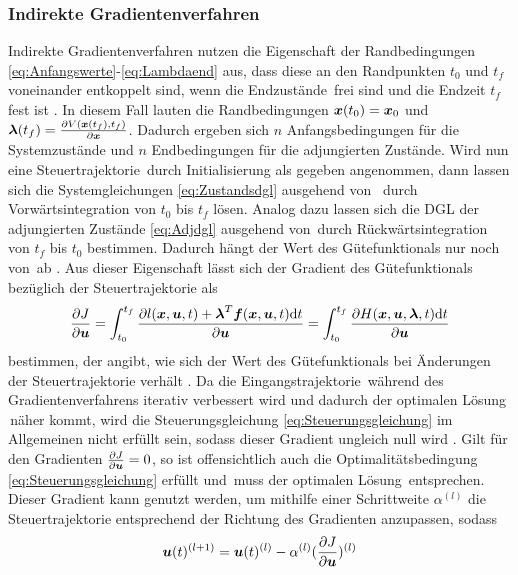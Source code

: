 \subsubsection{Indirekte Gradientenverfahren}\label{subsubsec:Gradientenverfahren_indirekt}
Indirekte Gradientenverfahren nutzen die Eigenschaft der Randbedingungen \eqref{eq:Anfangswerte}-\eqref{eq:Lambdaend} aus, dass diese an den Randpunkten $t_0$ und $t_f$ voneinander entkoppelt sind, wenn die Endzustände \xoftf\,frei sind und die Endzeit $t_f$ fest ist \cite{KnutGraichen.2012}. In diesem Fall lauten die Randbedingungen $\boldsymbol{x}(t_0) = \boldsymbol{x}_0$ und $\boldsymbol{\lambda}(t_f) = \frac{\partial V(\boldsymbol{x}(t_f),t_f)}{\partial \boldsymbol{x}}$. Dadurch ergeben sich $n$ Anfangsbedingungen für die Systemzustände und $n$ Endbedingungen für die adjungierten Zustände. Wird nun eine Steuertrajektorie \uoft\,durch Initialisierung als gegeben angenommen, dann lassen sich die Systemgleichungen \eqref{eq:Zustandsdgl} ausgehend von \xzero\, durch Vorwärtsintegration von $t_0$ bis $t_f$ lösen. Analog dazu lassen sich die \gls{DGL} der adjungierten Zustände \eqref{eq:Adjdgl} ausgehend von \lambdaoftf\,durch Rückwärtsintegration von $t_f$ bis $t_0$ bestimmen. Dadurch hängt der Wert des Gütefunktionals nur noch von \uoft\,ab \cite{Papageorgiou.2012}. Aus dieser Eigenschaft lässt sich der Gradient des Gütefunktionals bezüglich der Steuertrajektorie als
\begin{equation}
	\frac{\partial J}{\partial \boldsymbol{u}} = \int_{t_0}^{t_f}\frac{\partial l(\boldsymbol{x},\boldsymbol{u},t) + \boldsymbol{\lambda}^T\boldsymbol{f}(\boldsymbol{x},\boldsymbol{u},t)\textrm{d}{t}}{\partial \boldsymbol{u}} = \int_{t_0}^{t_f}\frac{\partial H(\boldsymbol{x},\boldsymbol{u},\boldsymbol{\lambda},t)\textrm{d}{t}}{\partial \boldsymbol{u}}
\end{equation}
bestimmen, der angibt, wie sich der Wert des Gütefunktionals bei Änderungen der Steuertrajektorie verhält \cite{Papageorgiou.2012}. Da die Eingangstrajektorie \uoft\,während des Gradientenverfahrens iterativ verbessert wird und dadurch der optimalen Lösung \uoptoft\,näher kommt, wird die Steuerungsgleichung \eqref{eq:Steuerungsgleichung} im Allgemeinen nicht erfüllt sein, sodass dieser Gradient ungleich null wird \cite{KnutGraichen.2012}. Gilt für den Gradienten $\frac{\partial J}{\partial \boldsymbol{u}} = 0$, so ist offensichtlich auch die Optimalitätsbedingung \eqref{eq:Steuerungsgleichung} erfüllt und \uoft\,muss der optimalen Lösung \uoptoft\,entsprechen. Dieser Gradient kann genutzt werden, um mithilfe einer Schrittweite $\alpha^{(l)}$ die Steuertrajektorie entsprechend der Richtung des Gradienten anzupassen, sodass  
\begin{equation}
\boldsymbol{u}(t)^{(l+1)} = \boldsymbol{u}(t)^{(l)} - \alpha^{(l)}(\frac{\partial J}{\partial \boldsymbol{u}})^{(l)}
\end{equation}
